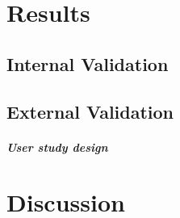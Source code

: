 \documentclass{UoYCSproject}
\begin{document}
\chapter{Results}
\label{cha:results}
\section{Internal Validation}
\begin{table}[htb]
  \centering
  \caption{Structure and parameter learning comparison.}
  \label{table:BNetCompare}
  \end{table}

\section{External Validation} %
\paragraph{User study design}

\chapter{Discussion}
\end{document}

